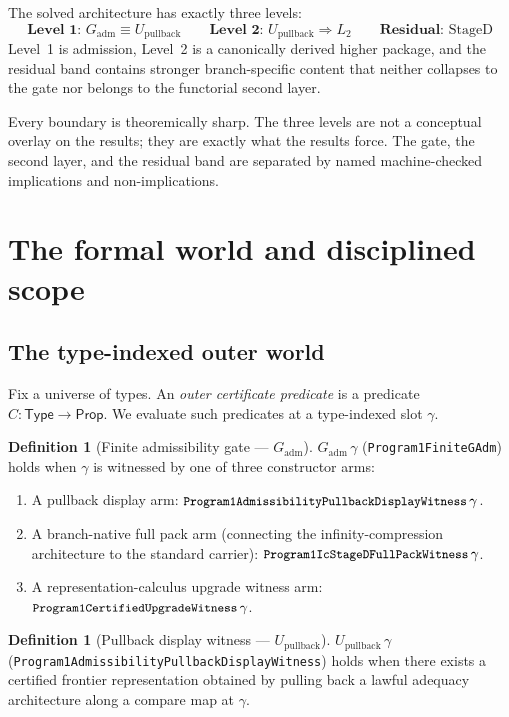 \documentclass[11pt]{article}
\theoremstyle{plain}
\theoremstyle{definition}
\newtheorem{definition}[theorem]{Definition}
\theoremstyle{remark}
\newcommand{\Gadm}{G_{\mathrm{adm}}}
\newcommand{\Upb}{U_{\mathrm{pullback}}}
\newcommand{\Stwo}{L_2}
\newcommand{\StageD}{\mathrm{StageD}}
\newcommand{\lean}[1]{\texttt{\small #1}}
\begin{document}
The solved architecture has exactly three levels:
\[
\textbf{Level 1: } \Gadm \equiv \Upb
\qquad
\textbf{Level 2: } \Upb \Rightarrow \Stwo
\qquad
\textbf{Residual: } \StageD
\]
Level~1 is admission, Level~2 is a canonically derived higher package, and
the residual band contains stronger branch-specific content that neither
collapses to the gate nor belongs to the functorial second layer.

Every boundary is theoremically sharp.  The three levels are not a conceptual
overlay on the results; they are exactly what the results force.  The gate,
the second layer, and the residual band are separated by named machine-checked
implications and non-implications.

\section{The formal world and disciplined scope}
\label{sec:scope}

\subsection{The type-indexed outer world}

Fix a universe of types.  An \emph{outer certificate predicate} is a
predicate $C : \mathsf{Type} \to \mathsf{Prop}$.  We evaluate such
predicates at a type-indexed slot $\gamma$.

\begin{definition}[Finite admissibility gate --- $\Gadm$]
  $\Gadm\,\gamma$ (\lean{Program1FiniteGAdm}) holds when $\gamma$ is
  witnessed by one of three constructor arms:
  \begin{enumerate}
    \item A pullback display arm:
      $\lean{Program1AdmissibilityPullbackDisplayWitness}\,\gamma$.
    \item A branch-native full pack arm (connecting the
      infinity-compression architecture to the standard carrier):
      $\lean{Program1IcStageDFullPackWitness}\,\gamma$.
    \item A representation-calculus upgrade witness arm:
      $\lean{Program1CertifiedUpgradeWitness}\,\gamma$.
  \end{enumerate}
\end{definition}

\begin{definition}[Pullback display witness --- $\Upb$]
  $\Upb\,\gamma$ (\lean{Program1Admissibility\-PullbackDisplayWitness}) holds
  when there exists a certified frontier representation obtained by
  pulling back a lawful adequacy architecture along a compare map at
  $\gamma$.
\end{definition}
\end{document}
